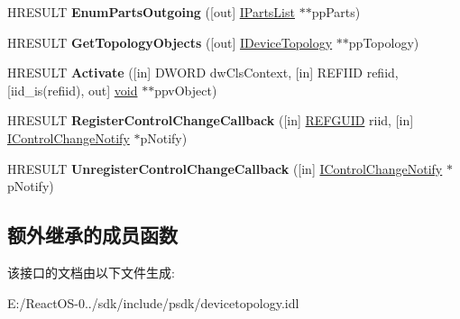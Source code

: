 \begin{DoxyCompactItemize}
H\+R\+E\+S\+U\+LT {\bfseries Enum\+Parts\+Outgoing} (\mbox{[}out\mbox{]} \hyperlink{interface_i_parts_list}{I\+Parts\+List} $\ast$$\ast$pp\+Parts)
\item 
\mbox{\label{interface_i_part_abd7cd561cb8e90f8c4a7e1113ab94a3e}} 
H\+R\+E\+S\+U\+LT {\bfseries Get\+Topology\+Objects} (\mbox{[}out\mbox{]} \hyperlink{interface_i_device_topology}{I\+Device\+Topology} $\ast$$\ast$pp\+Topology)
\item 
\mbox{\label{interface_i_part_a8e95249d89d3476dec32a3232a5e41e1}} 
H\+R\+E\+S\+U\+LT {\bfseries Activate} (\mbox{[}in\mbox{]} D\+W\+O\+RD dw\+Cls\+Context, \mbox{[}in\mbox{]} R\+E\+F\+I\+ID refiid, \mbox{[}iid\+\_\+is(refiid), out\mbox{]} \hyperlink{interfacevoid}{void} $\ast$$\ast$ppv\+Object)
\item 
\mbox{\label{interface_i_part_a762259ba79864b798bf056e6b5db1b2b}} 
H\+R\+E\+S\+U\+LT {\bfseries Register\+Control\+Change\+Callback} (\mbox{[}in\mbox{]} \hyperlink{struct___g_u_i_d}{R\+E\+F\+G\+U\+ID} riid, \mbox{[}in\mbox{]} \hyperlink{interface_i_control_change_notify}{I\+Control\+Change\+Notify} $\ast$p\+Notify)
\item 
\mbox{\label{interface_i_part_a0803eba52387b786afb21129001a0c70}} 
H\+R\+E\+S\+U\+LT {\bfseries Unregister\+Control\+Change\+Callback} (\mbox{[}in\mbox{]} \hyperlink{interface_i_control_change_notify}{I\+Control\+Change\+Notify} $\ast$p\+Notify)
\end{DoxyCompactItemize}
\subsection*{额外继承的成员函数}


该接口的文档由以下文件生成\+:\begin{DoxyCompactItemize}
\item 
E\+:/\+React\+O\+S-\/0../sdk/include/psdk/devicetopology.\+idl\end{DoxyCompactItemize}
